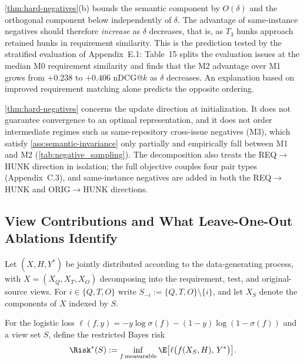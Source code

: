 \begin{remark}
\label{rem:thm1-prediction}
\cref{thm:hard-negatives}(b) bounds the semantic component by $O(\delta)$ and the orthogonal component below independently of $\delta$. The advantage of same-instance negatives should therefore \emph{increase} as $\delta$ decreases, that is, as $T_3$ hunks approach retained hunks in requirement similarity. This is the prediction tested by the stratified evaluation of Appendix~E.1: Table~15 splits the evaluation issues at the median M0 requirement similarity and finds that the M2 advantage over M1 grows from $+0.238$ to $+0.406$ nDCG@$k$ as $\delta$ decreases. An explanation based on improved requirement matching alone predicts the opposite ordering.
\end{remark}

\begin{remark}[Scope]
\label{rem:thm1-scope}
\cref{thm:hard-negatives} concerns the update direction at initialization. It does not guarantee convergence to an optimal representation, and it does not order intermediate regimes such as same-repository cross-issue negatives (M3), which satisfy \cref{ass:semantic-invariance} only partially and empirically fall between M1 and M2 (\cref{tab:negative_sampling}). The decomposition also treats the REQ$\to$HUNK direction in isolation; the full objective couples four pair types (Appendix~C.3), and same-instance negatives are added in both the REQ$\to$HUNK and ORIG$\to$HUNK directions.
\end{remark}

\subsection{View Contributions and What Leave-One-Out Ablations Identify}
\label{app:theory-thm2}

Let $(X, H, Y^\ast)$ be jointly distributed according to the data-generating process, with $X = (X_Q, X_T, X_O)$ decomposing into the requirement, test, and original-source views. For $i \in \{Q, T, O\}$ write $S_{-i} := \{Q, T, O\} \setminus \{i\}$, and let $X_S$ denote the components of $X$ indexed by $S$.

For the logistic loss $\ell(f, y) = -y \log \sigma(f) - (1-y)\log(1 - \sigma(f))$ and a view set
$S$, define the restricted Bayes risk
\begin{equation}
  \Risk^\ast(S) := \inf_{f \,\text{measurable}} \E\big[\ell\big(f(X_S, H),\, Y^\ast\big)\big] .
\end{equation}

